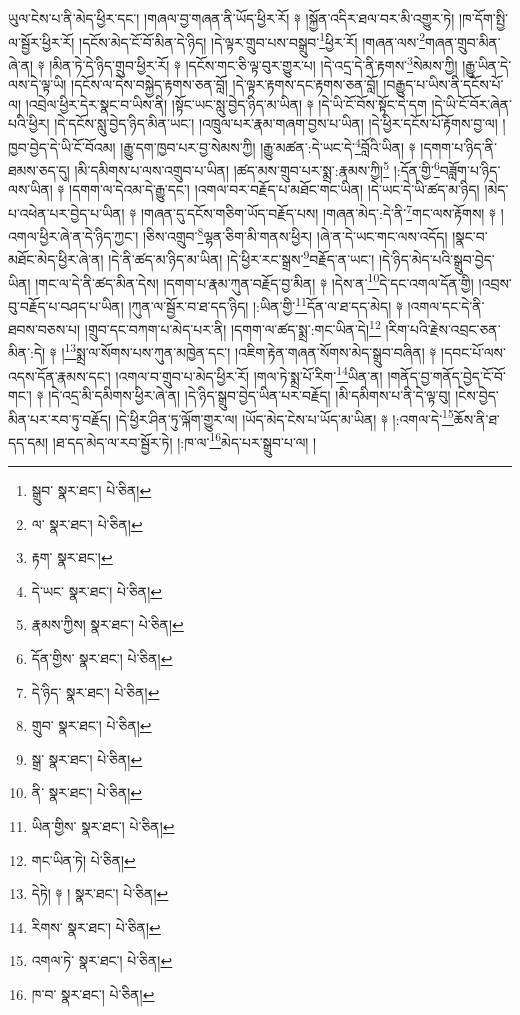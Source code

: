 ཡུལ་ངེས་པ་ནི་མེད་ཕྱིར་དང་། །གཞལ་བྱ་གཞན་ནི་ཡོད་ཕྱིར་རོ། ༈ །སྐྱོན་འདིར་ཐལ་བར་མི་འགྱུར་ཏེ། །ཁ་དོག་སྤྱི་ལ་སྦྱོར་ཕྱིར་རོ། །དངོས་མེད་ངོ་བོ་མིན་དེ་ཉིད། །དེ་ལྟར་གྲུབ་པས་བསྒྲུབ་\footnote{སྒྲུབ་  སྣར་ཐང་།  པེ་ཅིན། }ཕྱིར་རོ། །གཞན་ལས་\footnote{ལ་  སྣར་ཐང་།  པེ་ཅིན། }གཞན་གྲུབ་མིན་ཞེ་ན། ༈ །མིན་ཏེ་དེ་ཉིད་གྲུབ་ཕྱིར་རོ། ༈ །དངོས་གང་ཅི་ལྟ་བུར་གྱུར་པ། །དེ་འདྲ་དེ་ནི་རྟགས་\footnote{རྟག་  སྣར་ཐང་། }སེམས་ཀྱི། །རྒྱུ་ཡིན་དེ་ལས་དེ་ལྟ་ཡི། །དངོས་ལ་དེས་བསྐྱེད་རྟགས་ཅན་བློ། །དེ་ལྟར་རྟགས་དང་རྟགས་ཅན་བློ། །བརྒྱུད་པ་ཡིས་ནི་དངོས་པོ་ལ། །འབྲེལ་ཕྱིར་དེར་སྣང་བ་ཡིས་ནི། །སྟོང་ཡང་སླུ་བྱེད་ཉིད་མ་ཡིན། ༈ །དེ་ཡི་ངོ་བོས་སྟོང་དེ་དག །དེ་ཡི་ངོ་བོར་ཞེན་པའི་ཕྱིར། །དེ་དངོས་སླུ་བྱེད་ཉིད་མིན་ཡང་། །འཁྲུལ་པར་རྣམ་གཞག་བྱས་པ་ཡིན། །དེ་ཕྱིར་དངོས་པོ་རྟོགས་བྱ་ལ། །ཁྱབ་བྱེད་དེ་ཡི་ངོ་བོའམ། །རྒྱུ་དག་ཁྱབ་པར་བྱ་སེམས་ཀྱི། །རྒྱུ་མཚན་:དེ་ཡང་དེ་\footnote{དེ་ཡང་  སྣར་ཐང་།  པེ་ཅིན། }བློའི་ཡིན། ༈ །དགག་པ་ཉིད་ནི་ཐམས་ཅད་དུ། །མི་དམིགས་པ་ལས་འགྲུབ་པ་ཡིན། །ཚད་མས་གྲུབ་པར་སྨྲ་:རྣམས་ཀྱི།\footnote{རྣམས་ཀྱིས།  སྣར་ཐང་།  པེ་ཅིན། } །:དོན་གྱི་\footnote{དོན་གྱིས་  སྣར་ཐང་།  པེ་ཅིན། }བཟློག་པ་ཉིད་ལས་ཡིན། ༈ །དགག་ལ་དེའམ་དེ་རྒྱུ་དང་། །འགལ་བར་བརྗོད་པ་མཐོང་གང་ཡིན། །དེ་ཡང་དེ་ཡི་ཚད་མ་ཉིད། །མེད་པ་འཕེན་པར་བྱེད་པ་ཡིན། ༈ །གཞན་དུ་དངོས་གཅིག་ཡོད་བརྗོད་པས། །གཞན་མེད་:དེ་ནི་\footnote{དེ་ཉིད་  སྣར་ཐང་།  པེ་ཅིན། }གང་ལས་རྟོགས། ༈ །འགལ་ཕྱིར་ཞེ་ན་དེ་ཉིད་ཀྱང་། །ཅིས་འགྲུབ་\footnote{གྲུབ་  སྣར་ཐང་།  པེ་ཅིན། }ལྷན་ཅིག་མི་གནས་ཕྱིར། །ཞེ་ན་དེ་ཡང་གང་ལས་འདོད། །སྣང་བ་མཐོང་མེད་ཕྱིར་ཞེ་ན། །དེ་ནི་ཚད་མ་ཉིད་མ་ཡིན། །དེ་ཕྱིར་རང་སྒྲས་\footnote{སྒྲ་  སྣར་ཐང་།  པེ་ཅིན། }བརྗོད་ན་ཡང་། །དེ་ཉིད་མེད་པའི་སྒྲུབ་བྱེད་ཡིན། །གང་ལ་དེ་ནི་ཚད་མིན་དེས། །དགག་པ་རྣམ་ཀུན་བརྗོད་བྱ་མིན། ༈ །དེས་ན་\footnote{ནི་  སྣར་ཐང་།  པེ་ཅིན། }དེ་དང་འགལ་དོན་གྱི། །འབྲས་བུ་བརྗོད་པ་བཤད་པ་ཡིན། །ཀུན་ལ་སྦྱོར་བ་ཐ་དད་ཉིད། །:ཡིན་གྱི་\footnote{ཡིན་གྱིས་  སྣར་ཐང་།  པེ་ཅིན། }དོན་ལ་ཐ་དད་མེད། ༈ །འགལ་དང་དེ་ནི་ཐབས་བཅས་པ། །གྲུབ་དང་བཀག་པ་མེད་པར་ནི། །དགག་ལ་ཚད་སྨྲ་:གང་ཡིན་དེ།\footnote{གང་ཡིན་ཏེ།  པེ་ཅིན། } །རིག་པའི་རྗེས་འབྲང་ཅན་མིན་:དེ། ༈ །\footnote{དེཏེ། ༈ །  སྣར་ཐང་།  པེ་ཅིན། }སྨྲ་ལ་སོགས་པས་ཀུན་མཁྱེན་དང་། །འཇིག་རྟེན་གཞན་སོགས་མེད་སྒྲུབ་བཞིན། ༈ །དབང་པོ་ལས་འདས་དོན་རྣམས་དང་། །འགལ་བ་གྲུབ་པ་མེད་ཕྱིར་རོ། །གལ་ཏེ་སྨྲ་པོ་རིག་\footnote{རིགས་  སྣར་ཐང་།  པེ་ཅིན། }ཡིན་ན། །གནོད་བྱ་གནོད་བྱེད་ངོ་བོ་གང་། ༈ །དེ་འདྲ་མི་དམིགས་ཕྱིར་ཞེ་ན། །དེ་ཉིད་སྒྲུབ་བྱེད་ཡིན་པར་བརྗོད། །མི་དམིགས་པ་ནི་དེ་ལྟ་བུ། །ངེས་བྱེད་མིན་པར་རབ་ཏུ་བརྗོད། །དེ་ཕྱིར་ཤིན་ཏུ་ལྐོག་གྱུར་ལ། །ཡོད་མེད་ངེས་པ་ཡོད་མ་ཡིན། ༈ །:འགལ་དེ་\footnote{འགལ་ཏེ་  སྣར་ཐང་།  པེ་ཅིན། }ཆོས་ནི་ཐ་དད་དམ། །ཐ་དད་མེད་ལ་རབ་སྦྱོར་ཏེ། །:ཁ་ལ་\footnote{ཁ་བ་  སྣར་ཐང་།  པེ་ཅིན། }མེད་པར་སྒྲུབ་པ་ལ། །

